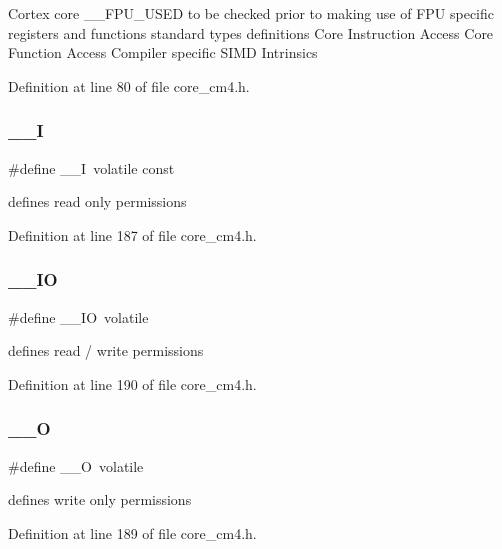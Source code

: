Cortex core \+\_\+\+\_\+\+F\+P\+U\+\_\+\+U\+S\+ED to be checked prior to making use of F\+PU specific registers and functions standard types definitions Core Instruction Access Core Function Access Compiler specific S\+I\+MD Intrinsics 

Definition at line 80 of file core\+\_\+cm4.\+h.

\mbox{\label{group___c_m_s_i_s__core__definitions_gaf63697ed9952cc71e1225efe205f6cd3}} 
\subsubsection{\texorpdfstring{\+\_\+\+\_\+I}{\_\_I}}
{\footnotesize\ttfamily \#define \+\_\+\+\_\+I~volatile const}

defines \textquotesingle{}read only\textquotesingle{} permissions 

Definition at line 187 of file core\+\_\+cm4.\+h.

\mbox{\label{group___c_m_s_i_s__core__definitions_gaec43007d9998a0a0e01faede4133d6be}} 
\subsubsection{\texorpdfstring{\+\_\+\+\_\+\+IO}{\_\_IO}}
{\footnotesize\ttfamily \#define \+\_\+\+\_\+\+IO~volatile}

defines \textquotesingle{}read / write\textquotesingle{} permissions 

Definition at line 190 of file core\+\_\+cm4.\+h.

\mbox{\label{group___c_m_s_i_s__core__definitions_ga7e25d9380f9ef903923964322e71f2f6}} 
\subsubsection{\texorpdfstring{\+\_\+\+\_\+O}{\_\_O}}
{\footnotesize\ttfamily \#define \+\_\+\+\_\+O~volatile}

defines \textquotesingle{}write only\textquotesingle{} permissions 

Definition at line 189 of file core\+\_\+cm4.\+h.

